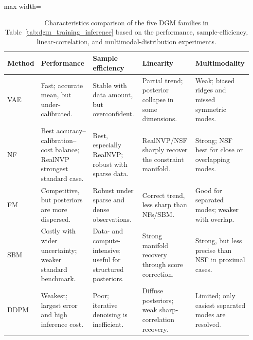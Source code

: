 \begin{table}[htbp]
    \centering
    \scriptsize
    \begin{adjustbox}{max width=\textwidth}
    \begin{tabular}{p{}p{}p{}p{}p{}}
        \toprule
        \textbf{Method} & \textbf{Performance} & \textbf{Sample efficiency} & \textbf{Linearity} & \textbf{Multimodality} \\
        \midrule
        \ac{VAE} & Fast; accurate mean, but under-calibrated. & Stable with data amount, but overconfident. & Partial trend; posterior collapse in some dimensions. & Weak; biased ridges and missed symmetric modes. \\
        \ac{NF} & Best accuracy--calibration--cost balance; \ac{RealNVP} strongest standard case. & Best, especially \ac{RealNVP}; robust with sparse data. & \ac{RealNVP}/\ac{NSF} sharply recover the constraint manifold. & Strong; \ac{NSF} best for close or overlapping modes. \\
        \ac{FM} & Competitive, but posteriors are more dispersed. & Robust under sparse and dense observations. & Correct trend, less sharp than \acp{NF}/\ac{SBM}. & Good for separated modes; weaker with overlap. \\
        \ac{SBM} & Costly with wider uncertainty; weaker standard benchmark. & Data- and compute-intensive; useful for structured posteriors. & Strong manifold recovery through score correction. & Strong, but less precise than \ac{NSF} in proximal cases. \\
        \ac{DDPM} & Weakest; largest error and high inference cost. & Poor; iterative denoising is inefficient. & Diffuse posteriors; weak sharp-correlation recovery. & Limited; only easiest separated modes are resolved. \\
        \bottomrule
    \end{tabular}
    \end{adjustbox}
    \caption[Characteristics Comparison of Deep Generative Models for Parameter Identification]{Characteristics comparison of the five \ac{DGM} families in Table~\ref{tab:dgm_training_inference} based on the performance, sample-efficiency, linear-correlation, and multimodal-distribution experiments.}
    \label{tab:dgm_characteristics_comparison}
\end{table}
